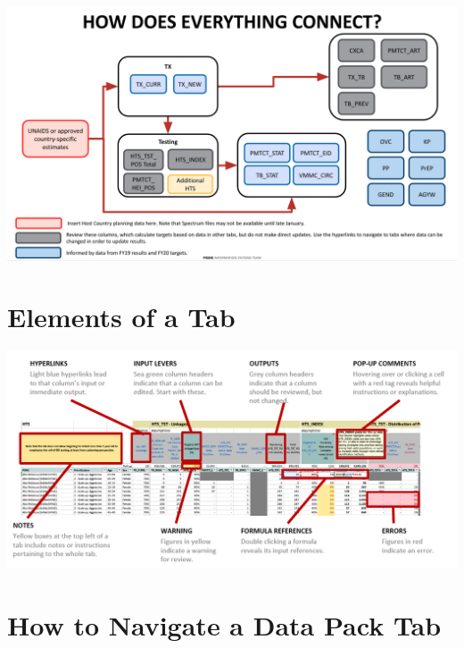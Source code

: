 \documentclass[
  openany]{book}
\begin{document}
\begin{center}

\includegraphics[width=9in]{./images/image3.png}

\end{center}

\newpage

\hypertarget{elements-of-a-tab}{%
\section{Elements of a Tab}\label{elements-of-a-tab}}

\begin{center}

\includegraphics[width=9in]{./images/image4.png}

\end{center}

\newpage

\hypertarget{how-to-navigate-a-data-pack-tab}{%
\section{How to Navigate a Data Pack Tab}\label{how-to-navigate-a-data-pack-tab}}
\end{document}
